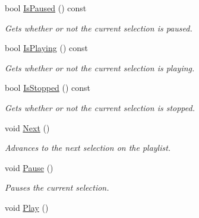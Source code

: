 \begin{DoxyCompactItemize}
bool \hyperlink{classMezzanine_1_1Audio_1_1MusicPlayer_ab225e4724df32be12cef403fa2f41071}{IsPaused} () const 
\begin{DoxyCompactList}\small\item\em Gets whether or not the current selection is paused. \item\end{DoxyCompactList}\item 
bool \hyperlink{classMezzanine_1_1Audio_1_1MusicPlayer_a9be65aec3b31c478d2318dc5f0946de9}{IsPlaying} () const 
\begin{DoxyCompactList}\small\item\em Gets whether or not the current selection is playing. \item\end{DoxyCompactList}\item 
bool \hyperlink{classMezzanine_1_1Audio_1_1MusicPlayer_ad62a633359931e0f7fa2b0ed5eb0ef9b}{IsStopped} () const 
\begin{DoxyCompactList}\small\item\em Gets whether or not the current selection is stopped. \item\end{DoxyCompactList}\item 
\hypertarget{classMezzanine_1_1Audio_1_1MusicPlayer_ac4fa784478176f750d166034eb491f2f}{
void \hyperlink{classMezzanine_1_1Audio_1_1MusicPlayer_ac4fa784478176f750d166034eb491f2f}{Next} ()}
\label{classMezzanine_1_1Audio_1_1MusicPlayer_ac4fa784478176f750d166034eb491f2f}

\begin{DoxyCompactList}\small\item\em Advances to the next selection on the playlist. \item\end{DoxyCompactList}\item 
\hypertarget{classMezzanine_1_1Audio_1_1MusicPlayer_acce40baf0f7f04ec14c6dbdba4794480}{
void \hyperlink{classMezzanine_1_1Audio_1_1MusicPlayer_acce40baf0f7f04ec14c6dbdba4794480}{Pause} ()}
\label{classMezzanine_1_1Audio_1_1MusicPlayer_acce40baf0f7f04ec14c6dbdba4794480}

\begin{DoxyCompactList}\small\item\em Pauses the current selection. \item\end{DoxyCompactList}\item 
\hypertarget{classMezzanine_1_1Audio_1_1MusicPlayer_ad0666abad1858e0d9c1be2af98c961f6}{
void \hyperlink{classMezzanine_1_1Audio_1_1MusicPlayer_ad0666abad1858e0d9c1be2af98c961f6}{Play} ()}
\label{classMezzanine_1_1Audio_1_1MusicPlayer_ad0666abad1858e0d9c1be2af98c961f6}


\end{DoxyCompactItemize}
